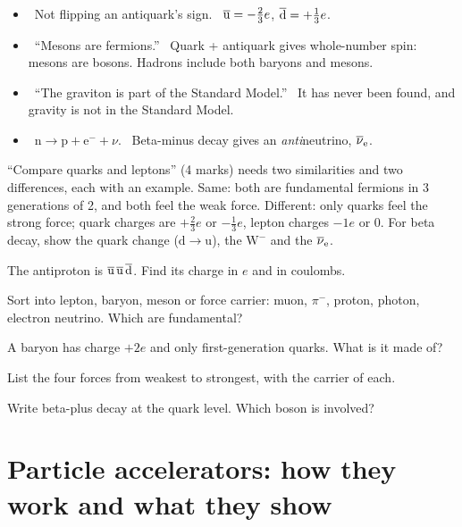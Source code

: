 \begin{mistakes}
\begin{itemize}
  \item \xmark\ Not flipping an antiquark's sign. \cmark\ $\overline{\mathrm{u}} = -\tfrac23 e$,
        $\overline{\mathrm{d}} = +\tfrac13 e$.
  \item \xmark\ ``Mesons are fermions.'' \cmark\ Quark + antiquark gives whole-number
        spin: mesons are bosons. Hadrons include both baryons and mesons.
  \item \xmark\ ``The graviton is part of the Standard Model.'' \cmark\ It has never been
        found, and gravity is not in the Standard Model.
  \item \xmark\ $\mathrm{n} \to \mathrm{p} + \mathrm{e}^- + \nu$. \cmark\ Beta-minus decay
        gives an \emph{anti}neutrino, $\overline{\nu}_\mathrm{e}$.
\end{itemize}
\end{mistakes}

\begin{examtip}
``Compare quarks and leptons'' (4 marks) needs two similarities and two differences,
each with an example. Same: both are fundamental fermions in 3 generations of 2, and both
feel the weak force. Different: only quarks feel the strong force; quark charges are
$+\tfrac23 e$ or $-\tfrac13 e$, lepton charges $-1e$ or 0. For beta decay, show the quark
change ($\mathrm{d} \to \mathrm{u}$), the $\mathrm{W}^-$ and the $\overline{\nu}_\mathrm{e}$.
\end{examtip}

\begin{quickcheck}
  \item The antiproton is $\overline{\mathrm{u}}\,\overline{\mathrm{u}}\,\overline{\mathrm{d}}$. Find its charge in
        $e$ and in coulombs.
  \item Sort into lepton, baryon, meson or force carrier: muon, $\pi^-$, proton, photon,
        electron neutrino. Which are fundamental?
  \item A baryon has charge $+2e$ and only first-generation quarks. What is it made of?
  \item List the four forces from weakest to strongest, with the carrier of each.
  \item Write beta-plus decay at the quark level. Which boson is involved?
\end{quickcheck}

\section{Particle accelerators: how they work and what they show}\label{ch5:sec:accel}

